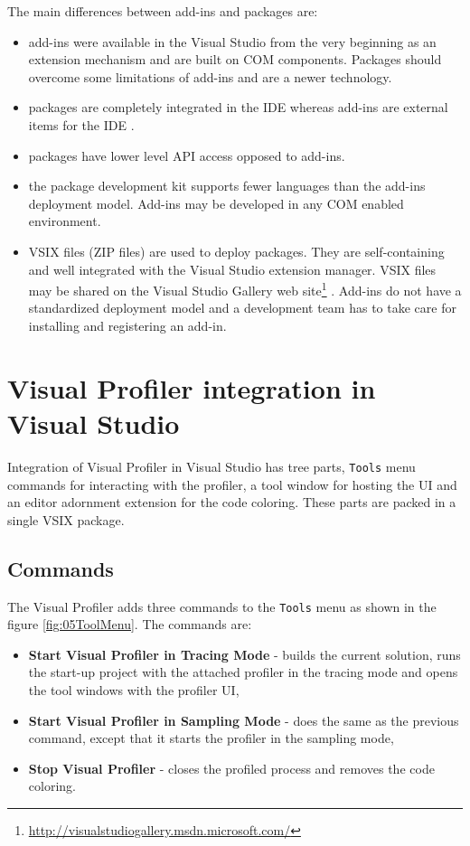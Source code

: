 The main differences between add-ins and packages are:
\begin{itemize}	
\item  add-ins were available in the Visual Studio from the very beginning as an extension mechanism and are built on COM components. Packages should overcome some limitations of add-ins and are a newer technology.

\item packages are completely integrated in the IDE whereas add-ins are external items for the IDE  .

\item packages have lower level API access opposed to add-ins.

\item the package development kit supports fewer languages than the add-ins deployment model. Add-ins may be developed in any COM enabled environment.

\item VSIX files (ZIP files) are used to deploy packages. They are self-containing and well integrated with the Visual Studio extension manager. VSIX files may be shared on the Visual Studio Gallery web site\footnote{\href{http://visualstudiogallery.msdn.microsoft.com/}{http://visualstudiogallery.msdn.microsoft.com/}}
. Add-ins do not have a standardized deployment model and a development team has to take care for installing and registering an add-in.
\end{itemize}


\section{Visual Profiler integration in Visual Studio}
Integration of Visual Profiler in Visual Studio has tree parts, \texttt{Tools} menu commands for interacting with the profiler, a tool window for hosting the UI and an editor adornment extension for the code coloring. These parts are packed in a single VSIX package.

\subsection{Commands}
The Visual Profiler adds three commands to the \texttt{Tools} menu as shown in the figure \ref{fig:05ToolMenu}. The commands are:


\begin{itemize}
\item \textbf{Start Visual Profiler in Tracing Mode} - builds the current solution, runs the start-up project with the attached profiler in the tracing mode and opens the tool windows with the profiler UI,

\item \textbf{Start Visual Profiler in Sampling Mode} - does the same as the previous command, except that it starts the profiler in the sampling mode,

\item \textbf{Stop Visual Profiler} - closes the profiled process and removes the code coloring.
\end{itemize}

